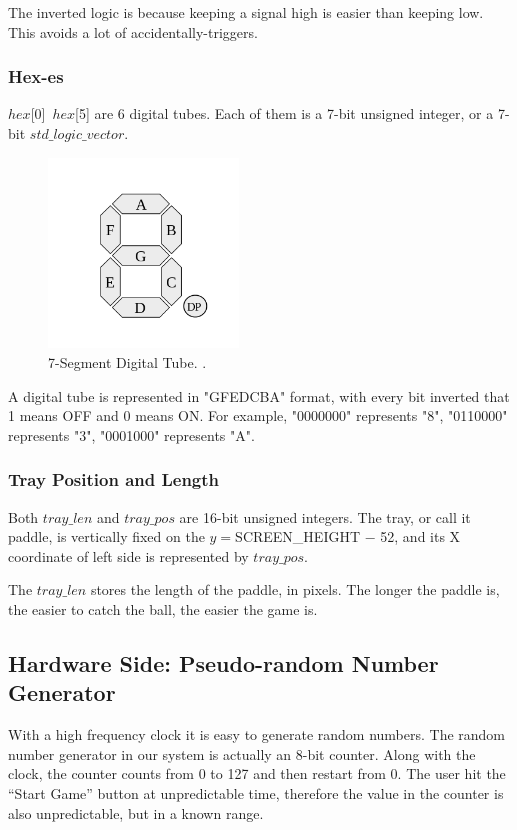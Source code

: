 \documentclass[conference]{IEEEtran}
\begin{document}
The inverted logic is because keeping a signal high is easier than keeping low. This avoids a lot of accidentally-triggers.

\subsubsection{Hex-es}
$hex$[0]~$hex$[5] are 6 digital tubes. Each of them is a 7-bit unsigned integer, or a 7-bit $std\_logic\_vector$. 

\begin{figure}[h] %
    \centering
    \includegraphics[width=0.45\textwidth]{imageset/seg7}
    \caption{
        7-Segment Digital Tube. \cite{bib_7seg}.
    }
    \label{fig_7seg}
\end{figure}

A digital tube is represented in "GFEDCBA" format, with every bit inverted that 1 means OFF and 0 means ON. For example, "0000000" represents "8", "0110000" represents "3", "0001000" represents "A".

\subsubsection{Tray Position and Length}
Both $tray\_len$ and $tray\_pos$ are 16-bit unsigned integers. The tray, or call it paddle, is vertically fixed on the $y=$SCREEN\_HEIGHT $-$ 52, and its X coordinate of left side is represented by $tray\_pos$.

The $tray\_len$ stores the length of the paddle, in pixels. The longer the paddle is, the easier to catch the ball, the easier the game is.

\subsection{Hardware Side: Pseudo-random Number Generator}
With a high frequency clock it is easy to generate random numbers. The random number generator in our system is actually an 8-bit counter. Along with the clock, the counter counts from 0 to 127 and then restart from 0. The user hit the ``Start Game'' button at unpredictable time, therefore the value in the counter is also unpredictable, but in a known range.
\end{document}
